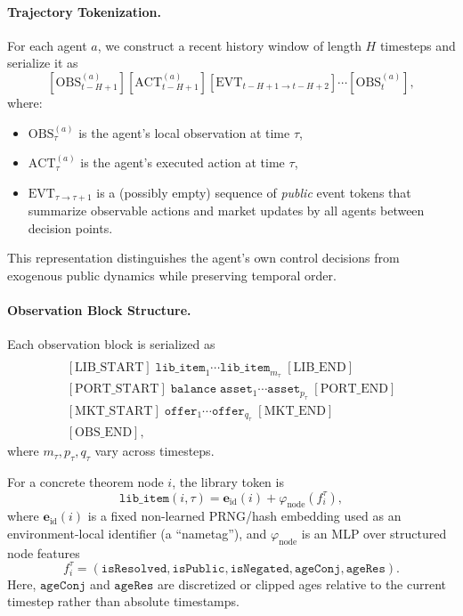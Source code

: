 \documentclass[letterpaper]{article} %
\renewcommand{\phi}{\varphi}
\begin{document}
\paragraph{Trajectory Tokenization.}
For each agent $a$, we construct a recent history window of length $H$ timesteps and serialize it as
\[
[\mathrm{OBS}_{t-H+1}^{(a)}][\mathrm{ACT}_{t-H+1}^{(a)}][\mathrm{EVT}_{t-H+1\rightarrow t-H+2}]
\cdots
[\mathrm{OBS}_t^{(a)}],
\]
where:
\begin{itemize}
    \item $\mathrm{OBS}_\tau^{(a)}$ is the agent's local observation at time $\tau$,
    \item $\mathrm{ACT}_\tau^{(a)}$ is the agent's executed action at time $\tau$,
    \item $\mathrm{EVT}_{\tau\rightarrow \tau+1}$ is a (possibly empty) sequence of \emph{public} event tokens that summarize observable actions and market updates by all agents between decision points.
\end{itemize}
This representation distinguishes the agent's own control decisions from exogenous public dynamics while preserving temporal order.

\paragraph{Observation Block Structure.}
Each observation block is serialized as
\begin{align*}
    [\mathrm{OBS\_START}][\mathrm{GLOBAL}]\\
[\mathrm{LIB\_START}]\;\texttt{lib\_item}_1\cdots \texttt{lib\_item}_{m_\tau}\;[\mathrm{LIB\_END}]\\
[\mathrm{PORT\_START}]\;\texttt{balance}\;\texttt{asset}_1\cdots \texttt{asset}_{p_\tau}\;[\mathrm{PORT\_END}]\\
[\mathrm{MKT\_START}]\;\texttt{offer}_1\cdots \texttt{offer}_{q_\tau}\;[\mathrm{MKT\_END}]\\
[\mathrm{OBS\_END}],
\end{align*}
where $m_\tau,p_\tau,q_\tau$ vary across timesteps.

For a concrete theorem node $i$, the library token is
\[
\texttt{lib\_item}(i,\tau)=\mathbf{e}_{\mathrm{id}}(i)+\phi_{\mathrm{node}}(f_i^\tau),
\]
where $\mathbf{e}_{\mathrm{id}}(i)$ is a fixed non-learned PRNG/hash embedding used as an environment-local identifier (a ``nametag''), and $\phi_{\mathrm{node}}$ is an MLP over structured node features
\[
f_i^\tau = (\texttt{isResolved},\texttt{isPublic},\texttt{isNegated},\texttt{ageConj},\texttt{ageRes}).
\]
Here, $\texttt{ageConj}$ and $\texttt{ageRes}$ are discretized or clipped ages relative to the current timestep rather than absolute timestamps.
\end{document}
